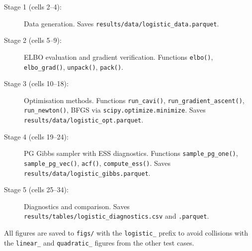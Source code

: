 \documentclass[11pt,a4paper]{article}
\begin{document}
\begin{description}
  \item[Stage 1 (cells 2--4):] Data generation.
    Saves \texttt{results/data/logistic\_data.parquet}.
  \item[Stage 2 (cells 5--9):] ELBO evaluation and gradient verification.
    Functions \texttt{elbo()}, \texttt{elbo\_grad()}, \texttt{unpack()}, \texttt{pack()}.
  \item[Stage 3 (cells 10--18):] Optimisation methods.
    Functions \texttt{run\_cavi()}, \texttt{run\_gradient\_ascent()},
    \texttt{run\_newton()}, BFGS via \texttt{scipy.optimize.minimize}.
    Saves \texttt{results/data/logistic\_opt.parquet}.
  \item[Stage 4 (cells 19--24):] PG Gibbs sampler with ESS diagnostics.
    Functions \texttt{sample\_pg\_one()}, \texttt{sample\_pg\_vec()},
    \texttt{acf()}, \texttt{compute\_ess()}.
    Saves \texttt{results/data/logistic\_gibbs.parquet}.
  \item[Stage 5 (cells 25--34):] Diagnostics and comparison.
    Saves \texttt{results/tables/logistic\_diagnostics.csv} and \texttt{.parquet}.
\end{description}

All figures are saved to \texttt{figs/} with the \texttt{logistic\_} prefix to avoid
collisions with the \texttt{linear\_} and \texttt{quadratic\_} figures from the
other test cases.
\end{document}
